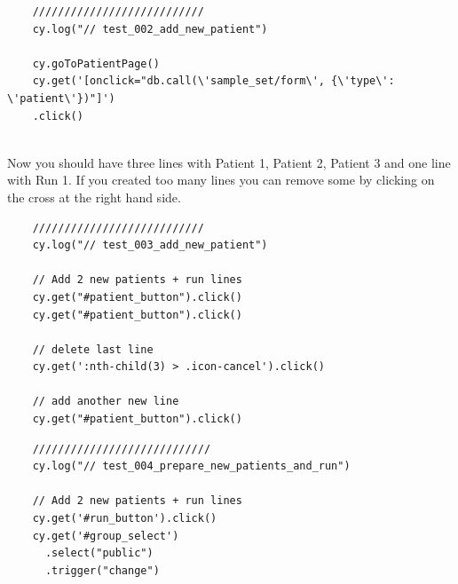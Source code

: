 \begin{verbatim}
    ///////////////////////////
    cy.log("// test_002_add_new_patient")
    
    cy.goToPatientPage()
    cy.get('[onclick="db.call(\'sample_set/form\', {\'type\': \'patient\'})"]')
    .click()


\end{verbatim}

  Now you should have three lines with Patient 1, Patient 2, Patient 3 and one
  line with Run 1.
  If you created too many lines you can remove some by clicking on the cross at
  the right hand side.

\begin{verbatim}
    ///////////////////////////
    cy.log("// test_003_add_new_patient")

    // Add 2 new patients + run lines
    cy.get("#patient_button").click()
    cy.get("#patient_button").click()

    // delete last line
    cy.get(':nth-child(3) > .icon-cancel').click()

    // add another new line
    cy.get("#patient_button").click()

\end{verbatim}

\begin{verbatim}
    ////////////////////////////
    cy.log("// test_004_prepare_new_patients_and_run")

    // Add 2 new patients + run lines
    cy.get('#run_button').click()
    cy.get('#group_select')
      .select("public")
      .trigger("change")

\end{verbatim}

